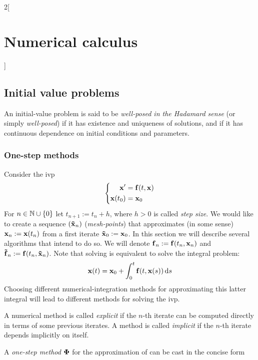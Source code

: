 \documentclass[../../../main_math.tex]{subfiles}
\begin{document}
\begin{multicols}{2}[\section{Numerical calculus}]
  \subsection{Initial value problems}
  \begin{definition}
    An initial-value problem is said to be \emph{well-posed in the Hadamard sense} (or simply \emph{well-posed}) if it has existence and uniqueness of solutions, and if it has continuous dependence on initial conditions and parameters.
  \end{definition}
  \subsubsection{One-step methods}
  Consider the ivp
  \begin{equation}\label{NC:ivp}
    \left\{
    \begin{aligned}
      \boldsymbol{\mathrm{x}}'     & = \boldsymbol{\mathrm{f}}(t,\boldsymbol{\mathrm{x}}) \\
      \boldsymbol{\mathrm{x}}(t_0) & = \boldsymbol{\mathrm{x}}_0
    \end{aligned}
    \right.
  \end{equation}
  For $n\in\mathbb{N}\cup\{0\}$ let $t_{n+1}:=t_{n}+h$, where $h>0$ is called \emph{step size}. We would like to create a sequence $(\boldsymbol{\mathrm{\tilde{x}}}_n)$ (\emph{mesh-points}) that approximates (in some sense) $\boldsymbol{\mathrm{{x}}}_n:=\boldsymbol{\mathrm{{x}}}(t_n)$ from a first iterate $\boldsymbol{\mathrm{\tilde{x}}}_0:=\boldsymbol{\mathrm{x}}_0$. In this section we will describe several algorithms that intend to do so. We will denote $\boldsymbol{\mathrm{f}}_n:=\boldsymbol{\mathrm{f}}(t_n,\boldsymbol{\mathrm{x}}_{n})$ and $\boldsymbol{\mathrm{\tilde{f}}}_n:=\boldsymbol{\mathrm{f}}(t_n,\boldsymbol{\mathrm{\tilde{x}}}_{n})$. Note that solving  is equivalent to solve the integral problem:
  $$\boldsymbol{\mathrm{x}}(t)=\boldsymbol{\mathrm{x}}_0+\int_0^t\boldsymbol{\mathrm{f}}(t,\boldsymbol{\mathrm{x}}(s))\dd{s}$$
  Choosing different numerical-integration methods for approximating this latter integral will lead to different methods for solving the ivp.
  \begin{definition}
    A numerical method is called \emph{explicit} if the $n$-th iterate can be computed directly in terms of some previous iterates. A method is called \emph{implicit} if the $n$-th iterate depends implicitly on itself.
  \end{definition}
  \begin{definition}
    A \emph{one-step method} $\boldsymbol{\mathrm{\Phi}}$ for the approximation of  can be cast in the concise form

\end{definition}
\end{multicols}
\end{document}
